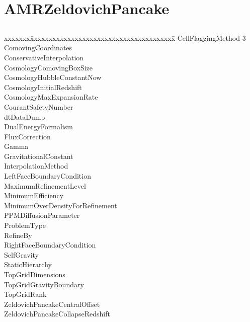 \documentclass{book}
\begin{document}
\section{AMRZeldovichPancake} \label{s:AMRZeldovichPancake}

\subsection{\enzo}

{\parametersize
\begin{tabbing}
xxxxxxx\=xxxxxxxxxxxxxxxxxxxxxxxxxxxxxxxxxxxxxxx\=\kill
\> CellFlaggingMethod         3     \\
\> ComovingCoordinates                \\
\> ConservativeInterpolation  \\
\> CosmologyComovingBoxSize        \\
\> CosmologyHubbleConstantNow  \\
\> CosmologyInitialRedshift          \\
\> CosmologyMaxExpansionRate       \\
\> CourantSafetyNumber     \\
\> dtDataDump              \\
\> DualEnergyFormalism            \\
\> FluxCorrection             \\
\> Gamma                   \\
\> GravitationalConstant              \\
\> InterpolationMethod        \\
\> LeftFaceBoundaryCondition          \\
\> MaximumRefinementLevel         \\
\> MinimumEfficiency            \\
\> MinimumOverDensityForRefinement     \\
\> PPMDiffusionParameter          \\
\> ProblemType                       \\
\> RefineBy                       \\
\> RightFaceBoundaryCondition  \\
\> SelfGravity                        \\
\> StaticHierarchy                \\
\> TopGridDimensions           \\
\> TopGridGravityBoundary             \\
\> TopGridRank                 \\
\> ZeldovichPancakeCentralOffset     \\
\> ZeldovichPancakeCollapseRedshift 
\end{tabbing}}
\end{document}
